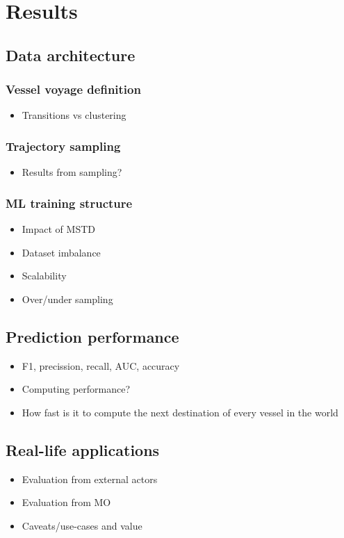 \chapter{Results}

\section{Data architecture}

\subsection{Vessel voyage definition}

\begin{itemize}
    \item Transitions vs clustering
\end{itemize}

\subsection{Trajectory sampling}

\begin{itemize}
    \item Results from sampling?
\end{itemize}

\subsection{ML training structure}

\begin{itemize}
    \item Impact of MSTD
    \item Dataset imbalance
    \item Scalability
    \item Over/under sampling
\end{itemize}

\section{Prediction performance}

\begin{itemize}
    \item F1, precission, recall, AUC, accuracy
    \item Computing performance?
    \item How fast is it to compute the next destination of every vessel in the world
\end{itemize}

\section{Real-life applications}

\begin{itemize}
    \item Evaluation from external actors
    \item Evaluation from MO
    \item Caveats/use-cases and value
\end{itemize}
